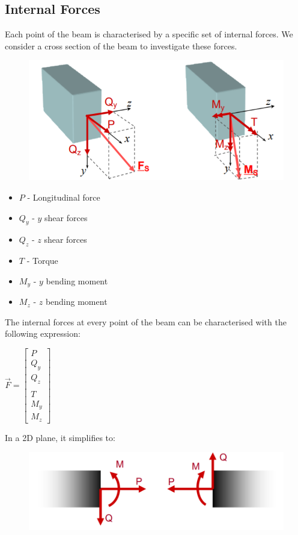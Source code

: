 \documentclass[class=report, crop=false, 12pt,a4paper]{standalone}
\begin{document}
\subsection{Internal Forces}
Each point of the beam is characterised by a specific set of internal forces. We consider a cross section of the beam to investigate these forces.
\begin{figure}[H]
  \centering
  \includegraphics[width = 0.75 \textwidth]{../img/3dinternalforces.PNG}
\end{figure}
\begin{itemize}[noitemsep]
  \item $P$ - Longitudinal force
  \item $Q_y$ - $y$ shear forces
  \item $Q_z$ - $z$ shear forces
  \item $T$ - Torque
  \item $M_y$ - $y$ bending moment
  \item $M_z$ - $z$ bending moment
\end{itemize}
The internal forces at every point of the beam can be characterised with the following expression:
\begin{center}
  $\vec{F} = \left[ \begin{array}{ccccccc} P \\ Q_y \\ Q_z \\ \\ T \\ M_y \\ M_z \end{array}\right]$
\end{center}
In a 2D plane, it simplifies to:
\begin{figure}[H]
  \centering
  \includegraphics[width = 0.8 \textwidth]{../img/2dinternalforces.PNG}
\end{figure}
\end{document}
